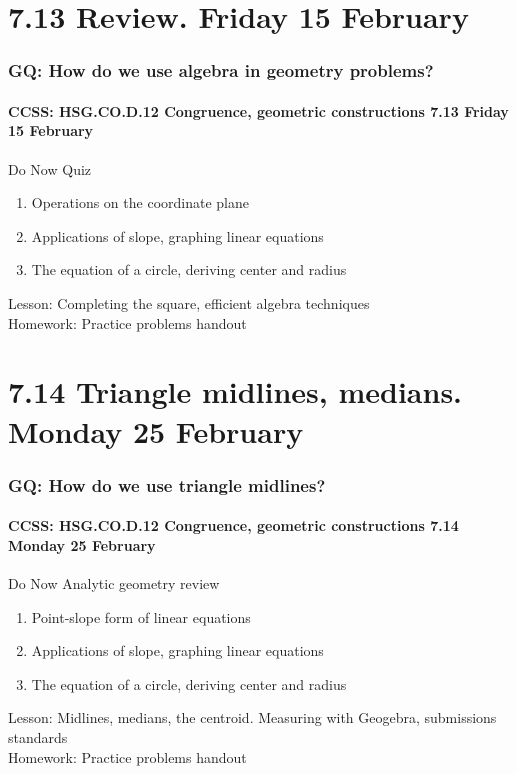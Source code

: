 \documentclass{beamer}
\begin{document}
\section{7.13 Review. Friday 15 February}
  \frame
  {
    \frametitle{GQ: How do we use algebra in geometry problems?}
    \framesubtitle{CCSS: HSG.CO.D.12 Congruence, geometric constructions \hfill \alert{7.13 Friday 15 February}}

    \begin{block}{Do Now Quiz}
      \begin{enumerate}
        \item Operations on the coordinate plane
        \item Applications of slope, graphing linear equations
        \item The equation of a circle, deriving center and radius
      \end{enumerate}
    \end{block}
    Lesson: Completing the square, efficient algebra techniques\\[0.5cm]
    Homework: Practice problems handout
  }

\section{7.14 Triangle midlines, medians. Monday 25 February}
  \frame
  {
    \frametitle{GQ: How do we use triangle midlines?}
    \framesubtitle{CCSS: HSG.CO.D.12 Congruence, geometric constructions \hfill \alert{7.14 Monday 25 February}}

    \begin{block}{Do Now Analytic geometry review}
      \begin{enumerate}
        \item Point-slope form of linear equations
        \item Applications of slope, graphing linear equations
        \item The equation of a circle, deriving center and radius
      \end{enumerate}
    \end{block}
    Lesson: Midlines, medians, the centroid. Measuring with Geogebra, submissions standards\\[0.5cm]
    Homework: Practice problems handout
  }
\end{document}
